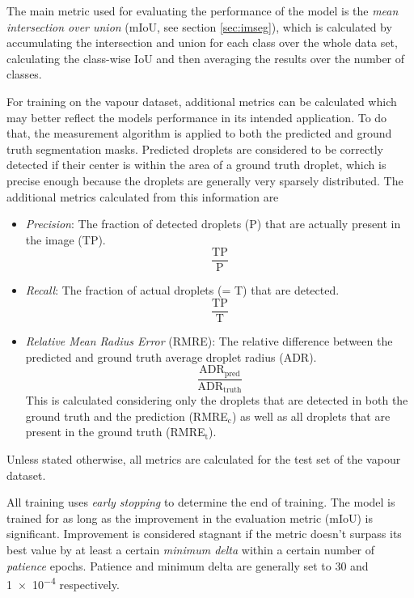 The main metric used for evaluating the performance of the model is the \emph{mean intersection over union} (mIoU, see section \ref{sec:imseg}), which is calculated by accumulating the intersection and union for each class over the whole data set, calculating the class-wise IoU and then averaging the results over the number of classes.  

For training on the vapour dataset, additional metrics can be calculated which may better reflect the models performance in its intended application. To do that, the measurement algorithm is applied to both the predicted and ground truth segmentation masks. Predicted droplets are considered to be correctly detected if their center is within the area of a ground truth droplet, which is precise enough because the droplets are generally very sparsely distributed.
The additional metrics calculated from this information are 
\begin{itemize}
    \item \emph{Precision}: The fraction of detected droplets (P) that are actually present in the image (TP). $$\frac{\text{TP}}{\text{P}}$$
    \item \emph{Recall}: The fraction of actual droplets (= T) that are detected. $$\frac{\text{TP}}{\text{T}}$$
    \item \emph{Relative Mean Radius Error} (RMRE): The relative difference between the predicted and ground truth average droplet radius (ADR). $$\frac{\text{ADR}_\text{pred}}{\text{ADR}_\text{truth}}$$
    This is calculated considering only the droplets that are detected in both the ground truth and the prediction (RMRE$_\text{c}$) as well as all droplets that are present in the ground truth (RMRE$_\text{t}$).
\end{itemize}
Unless stated otherwise, all metrics are calculated for the test set of the vapour dataset.

All training uses \emph{early stopping} to determine the end of training. The model is trained for as long as the improvement in the evaluation metric (mIoU) is significant. Improvement is considered stagnant if the metric doesn't surpass its best value by at least a certain \emph{minimum delta} within a certain number of \emph{patience} epochs. Patience and minimum delta are generally set to 30 and \num{1e-4} respectively.


